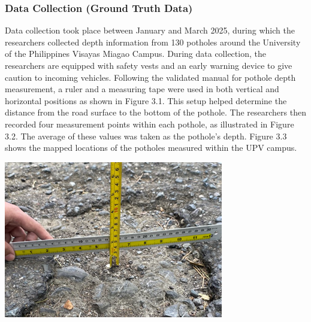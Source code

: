 \subsubsection{Data Collection (Ground Truth Data)}
Data collection took place between January and March 2025, during which the researchers collected depth information from 130 potholes around the University of the Philippines Visayas Miagao Campus. During data collection, the researchers are equipped with safety vests and an early warning device to give caution to incoming vehicles. Following the validated manual for pothole depth measurement, a ruler and a measuring tape were used in both vertical and horizontal positions as shown in Figure 3.1. This setup helped determine the distance from the road surface to the bottom of the pothole. The researchers then recorded four measurement points within each pothole, as illustrated in Figure 3.2. The average of these values was taken as the pothole’s depth. Figure 3.3 shows the mapped locations of the potholes measured within the UPV campus. 

\begin{center}
	\includegraphics[scale=0.85]{measure.png}
\end{center}

